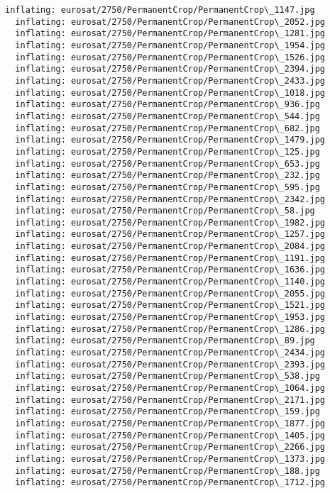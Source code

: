 \documentclass[11pt]{article}
\begin{document}
\begin{Verbatim}[commandchars=\\\{\}]
  inflating: eurosat/2750/PermanentCrop/PermanentCrop\_1147.jpg
  inflating: eurosat/2750/PermanentCrop/PermanentCrop\_2052.jpg
  inflating: eurosat/2750/PermanentCrop/PermanentCrop\_1281.jpg
  inflating: eurosat/2750/PermanentCrop/PermanentCrop\_1954.jpg
  inflating: eurosat/2750/PermanentCrop/PermanentCrop\_1526.jpg
  inflating: eurosat/2750/PermanentCrop/PermanentCrop\_2394.jpg
  inflating: eurosat/2750/PermanentCrop/PermanentCrop\_2433.jpg
  inflating: eurosat/2750/PermanentCrop/PermanentCrop\_1018.jpg
  inflating: eurosat/2750/PermanentCrop/PermanentCrop\_936.jpg
  inflating: eurosat/2750/PermanentCrop/PermanentCrop\_544.jpg
  inflating: eurosat/2750/PermanentCrop/PermanentCrop\_682.jpg
  inflating: eurosat/2750/PermanentCrop/PermanentCrop\_1479.jpg
  inflating: eurosat/2750/PermanentCrop/PermanentCrop\_125.jpg
  inflating: eurosat/2750/PermanentCrop/PermanentCrop\_653.jpg
  inflating: eurosat/2750/PermanentCrop/PermanentCrop\_232.jpg
  inflating: eurosat/2750/PermanentCrop/PermanentCrop\_595.jpg
  inflating: eurosat/2750/PermanentCrop/PermanentCrop\_2342.jpg
  inflating: eurosat/2750/PermanentCrop/PermanentCrop\_58.jpg
  inflating: eurosat/2750/PermanentCrop/PermanentCrop\_1982.jpg
  inflating: eurosat/2750/PermanentCrop/PermanentCrop\_1257.jpg
  inflating: eurosat/2750/PermanentCrop/PermanentCrop\_2084.jpg
  inflating: eurosat/2750/PermanentCrop/PermanentCrop\_1191.jpg
  inflating: eurosat/2750/PermanentCrop/PermanentCrop\_1636.jpg
  inflating: eurosat/2750/PermanentCrop/PermanentCrop\_1140.jpg
  inflating: eurosat/2750/PermanentCrop/PermanentCrop\_2055.jpg
  inflating: eurosat/2750/PermanentCrop/PermanentCrop\_1521.jpg
  inflating: eurosat/2750/PermanentCrop/PermanentCrop\_1953.jpg
  inflating: eurosat/2750/PermanentCrop/PermanentCrop\_1286.jpg
  inflating: eurosat/2750/PermanentCrop/PermanentCrop\_89.jpg
  inflating: eurosat/2750/PermanentCrop/PermanentCrop\_2434.jpg
  inflating: eurosat/2750/PermanentCrop/PermanentCrop\_2393.jpg
  inflating: eurosat/2750/PermanentCrop/PermanentCrop\_538.jpg
  inflating: eurosat/2750/PermanentCrop/PermanentCrop\_1064.jpg
  inflating: eurosat/2750/PermanentCrop/PermanentCrop\_2171.jpg
  inflating: eurosat/2750/PermanentCrop/PermanentCrop\_159.jpg
  inflating: eurosat/2750/PermanentCrop/PermanentCrop\_1877.jpg
  inflating: eurosat/2750/PermanentCrop/PermanentCrop\_1405.jpg
  inflating: eurosat/2750/PermanentCrop/PermanentCrop\_2266.jpg
  inflating: eurosat/2750/PermanentCrop/PermanentCrop\_1373.jpg
  inflating: eurosat/2750/PermanentCrop/PermanentCrop\_188.jpg
  inflating: eurosat/2750/PermanentCrop/PermanentCrop\_1712.jpg

\end{Verbatim}
\end{document}
